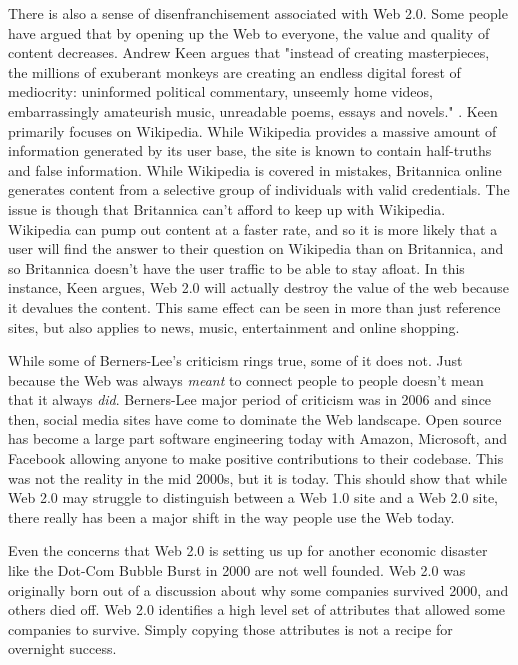 \documentclass[12pt]{article}
\begin{document}
There is also a sense of disenfranchisement associated with Web 2.0.  Some people have argued that by opening up the Web to everyone, the value and quality of content decreases.  Andrew Keen argues that "instead of creating masterpieces, the millions of exuberant monkeys are creating an endless digital forest of mediocrity: uninformed political commentary, unseemly home videos, embarrassingly amateurish music, unreadable poems, essays and novels." \cite{flintoff}.  Keen primarily focuses on Wikipedia.  While Wikipedia provides a massive amount of information generated by its user base, the site is known to contain half-truths and false information.  While Wikipedia is covered in mistakes, Britannica online generates content from a selective group of individuals with valid credentials.  The issue is though that Britannica can't afford to keep up with Wikipedia.  Wikipedia can pump out content at a faster rate, and so it is more likely that a user will find the answer to their question on Wikipedia than on Britannica, and so Britannica doesn't have the user traffic to be able to stay afloat.  In this instance, Keen argues, Web 2.0 will actually destroy the value of the web because it devalues the content.  This same effect can be seen in more than just reference sites, but also applies to news, music, entertainment and online shopping.

While some of Berners-Lee's criticism rings true, some of it does not.  Just because the Web was always \textit{meant} to connect people to people doesn't mean that it always \textit{did}.  Berners-Lee major period of criticism was in 2006 and since then, social media sites have come to dominate the Web landscape.  Open source has become a large part software engineering today with Amazon, Microsoft, and Facebook allowing anyone to make positive contributions to their codebase.  This was not the reality in the mid 2000s, but it is today. This should show that while Web 2.0 may struggle to distinguish between a Web 1.0 site and a Web 2.0 site, there really has been a major shift in the way people use the Web today.

Even the concerns that Web 2.0 is setting us up for another economic disaster like the Dot-Com Bubble Burst in 2000 are not well founded.  Web 2.0 was originally born out of a discussion about why some companies survived 2000, and others died off.  Web 2.0 identifies a high level set of attributes that allowed some companies to survive.  Simply copying those attributes is not a recipe for overnight success.
\end{document}

